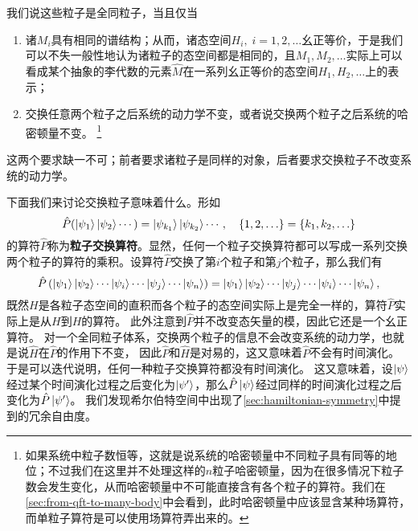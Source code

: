 \documentclass[UTF8, a4paper]{ctexart}
\begin{document}
我们说这些粒子是全同粒子，当且仅当
\begin{enumerate}
    \item 诸$M_i$具有相同的谱结构；从而，诸态空间$H_i, \; i=1, 2, \ldots$幺正等价，于是我们可以不失一般性地认为诸粒子的态空间都是相同的，且$M_1, M_2, \ldots$实际上可以看成某个抽象的李代数的元素$\hat{M}$在一系列幺正等价的态空间$H_1, H_2, \ldots$上的表示；
    \item 交换任意两个粒子之后系统的动力学不变，或者说交换两个粒子之后系统的哈密顿量不变。%
    \footnote{如果系统中粒子数恒等，这就是说系统的哈密顿量中不同粒子具有同等的地位；不过我们在这里并不处理这样的$n$粒子哈密顿量，因为在很多情况下粒子数会发生变化，从而哈密顿量中不可能直接含有各个粒子的算符。我们在\autoref{sec:from-qft-to-many-body}中会看到，此时哈密顿量中应该显含某种场算符，而单粒子算符是可以使用场算符弄出来的。} %
\end{enumerate}
这两个要求缺一不可；前者要求诸粒子是同样的对象，后者要求交换粒子不改变系统的动力学。

下面我们来讨论交换粒子意味着什么。形如
\[
    \hat{P} (\ket{\psi_1}\ket{\psi_2}\cdots) = \ket{\psi_{k_1}}\ket{\psi_{k_2}}\cdots, \quad \{1, 2, \ldots\} = \{k_1, k_2, \ldots\}
\]
的算符$\hat{P}$称为\textbf{粒子交换算符}。显然，任何一个粒子交换算符都可以写成一系列交换两个粒子的算符的乘积。设算符$\hat{P}$交换了第$i$个粒子和第$j$个粒子，那么我们有
\[
    \hat{P} \left( \ket{\psi_1} \ket{\psi_2} \cdots \ket{\psi_i} \cdots \ket{\psi_j} \cdots \ket{\psi_n} \right) = \ket{\psi_1} \ket{\psi_2} \cdots \ket{\psi_j} \cdots \ket{\psi_i} \cdots \ket{\psi_n},
\]
既然$H$是各粒子态空间的直积而各个粒子的态空间实际上是完全一样的，算符$\hat{P}$实际上是从$H$到$H$的算符。
此外注意到$\hat{P}$并不改变态矢量的模，因此它还是一个幺正算符。
对一个全同粒子体系，交换两个粒子的信息不会改变系统的动力学，也就是说$\hat{H}$在$\hat{P}$的作用下不变，
因此$\hat{P}$和$\hat{H}$是对易的，这又意味着$\hat{P}$不会有时间演化。
于是可以迭代说明，任何一种粒子交换算符都没有时间演化。
这又意味着，设$\ket{\psi}$经过某个时间演化过程之后变化为$\ket{\psi'}$，那么$\hat{P} \ket{\psi}$经过同样的时间演化过程之后变化为$\hat{P} \ket{\psi'}$。
我们发现希尔伯特空间中出现了\autoref{sec:hamiltonian-symmetry}中提到的冗余自由度。%
\end{document}
